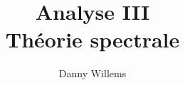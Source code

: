 \documentclass[a4paper, 12pt]{article}
\title{Analyse III \\ Théorie spectrale}
\author{Danny Willems}
\begin{document}
\maketitle

\begin{abstract}

\end{abstract}

\tableofcontents





\end{document}
